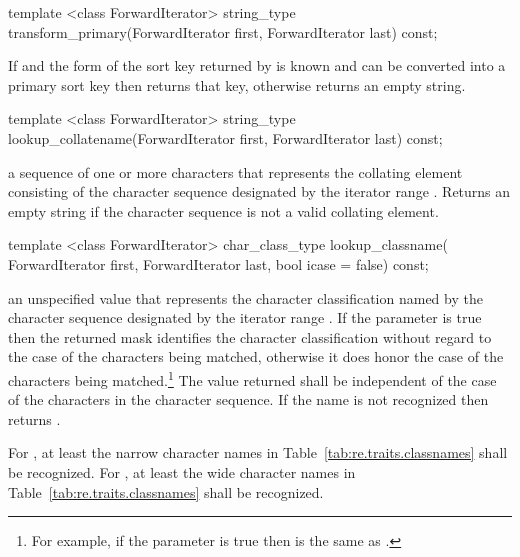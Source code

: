 %
\begin{itemdecl}
template <class ForwardIterator>
  string_type transform_primary(ForwardIterator first, ForwardIterator last) const; 
\end{itemdecl}

\begin{itemdescr}
\pnum\effects If 
and the form of the sort key returned
by  is known and
can be converted into a primary sort key then returns that key,
otherwise returns an empty string.
\end{itemdescr}

%
\begin{itemdecl}
template <class ForwardIterator>
  string_type lookup_collatename(ForwardIterator first, ForwardIterator last) const; 
\end{itemdecl}

\begin{itemdescr}
\pnum\returns a sequence of one or more characters that
represents the collating element consisting of the character
sequence designated by the iterator range .
Returns an empty string if the character sequence is not a
valid collating element.
\end{itemdescr}

%
\begin{itemdecl}
template <class ForwardIterator>
  char_class_type lookup_classname(
    ForwardIterator first, ForwardIterator last, bool icase = false) const; 
\end{itemdecl}

\begin{itemdescr}
\pnum\returns an unspecified value that represents
the character classification named by the character sequence
designated by the iterator range .
If the parameter  is true then the returned mask identifies the
character classification without regard to the case of the characters being
matched, otherwise it does honor the case of the characters being
matched.\footnote{For example, if the parameter  is true then
\tcode{[[:lower:]]} is the same as \tcode{[[:alpha:]]}.}
The value
returned shall be independent of the case of the characters in
the character sequence. If the name
is not recognized then returns .

\pnum
\remarks  For , at least the narrow character names
in Table~\ref{tab:re.traits.classnames} shall be recognized.
For , at least the wide character names
in Table~\ref{tab:re.traits.classnames} shall be recognized.
\end{itemdescr}


